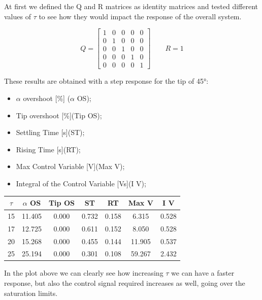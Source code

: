 At first we defined the Q and R matrices as identity matrices and tested different values of $\tau$ to see how they would impact the response of the overall system.

\begin{equation*}
Q = 
    \begin{bmatrix}
    1 & 0 & 0 & 0 & 0 \\
    0 & 1 & 0 & 0 & 0 \\
    0 & 0 & 1 & 0 & 0 \\
    0 & 0 & 0 & 1 & 0 \\ 
    0 & 0 & 0 & 0 & 1
\end{bmatrix} 
\qquad 
R = 1
\end{equation*} 

These results are obtained with a step response for the tip of 45°:
\begin{itemize}
    \item $\alpha$ overshoot [\%] ($\alpha$ OS);
    \item Tip overshoot [\%](Tip OS);
    \item Settling Time [s](ST);
    \item Rising Time [s](RT);
    \item Max Control Variable [V](Max V);
    \item Integral of the Control Variable [Vs](I V);
    
\end{itemize}

\begin{table}[h!]
    \centering
    \hspace*{-3em}
    \begin{tabular}{||c c c c c c c||} 
    \hline
    $\tau$ & $\alpha$ OS & Tip OS & ST & RT & Max V & I V\\ 
    \hline\hline
    15 &  11.405 & 0.000 & 0.732 & 0.158 & 6.315 & 0.528 \\ 
    \hline
    17 &  12.725 & 0.000 & 0.611 & 0.152 & 8.050 & 0.528 \\ 
    \hline
    20 & 15.268 & 0.000 & 0.455 & 0.144 & 11.905 & 0.537 \\ 
    \hline
    25 & 25.194 & 0.000 & 0.301 & 0.108 & 59.267 & 2.432 \\ 
    \hline
    \end{tabular}
\end{table}

In the plot above we can clearly see how increasing $\tau$ we can have a faster response, but also the control signal required increases as well, going over the saturation limits.

